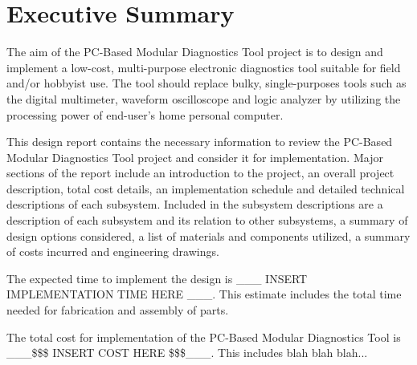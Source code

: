 \section*{Executive Summary}
The aim of the PC-Based Modular Diagnostics Tool project is to design and implement
a low-cost, multi-purpose electronic diagnostics tool suitable for field and/or
hobbyist use. The tool should replace bulky, single-purposes tools such as the digital 
multimeter, waveform oscilloscope and logic analyzer by utilizing the processing
power of end-user's home personal computer.

This design report contains the necessary information to review the PC-Based Modular 
Diagnostics Tool project and consider it for implementation. Major sections of the
report include an introduction to the project, an overall project description,
total cost details, an implementation schedule and detailed technical descriptions of each
subsystem. Included in the subsystem descriptions are a description of each subsystem
and its relation to other subsystems, a summary of design options considered, a list 
of materials and components utilized, a summary of costs incurred and engineering drawings.

The expected time to implement the design is \_\_\_ INSERT IMPLEMENTATION TIME HERE \_\_\_.
This estimate includes the total time needed for fabrication and assembly of parts.

The total cost for implementation of the PC-Based Modular Diagnostics Tool is 
\_\_\_\$\$\$ INSERT COST HERE \$\$\$\_\_\_. This includes blah blah blah...


